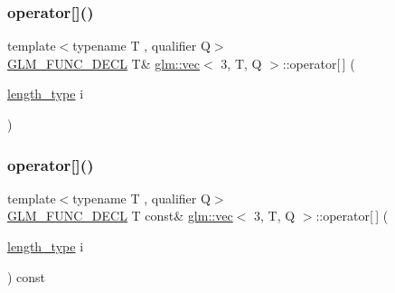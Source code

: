 \mbox{\label{structglm_1_1vec_3_013_00_01_t_00_01_q_01_4_a7f555e7e0581a8e53ac675fde684055b}} 
\subsubsection{\texorpdfstring{operator[]()}{operator[]()}\hspace{0.1cm}{\footnotesize\ttfamily [1/2]}}
{\footnotesize\ttfamily template$<$typename T , qualifier Q$>$ \\
\hyperlink{setup_8hpp_ab2d052de21a70539923e9bcbf6e83a51}{G\+L\+M\+\_\+\+F\+U\+N\+C\+\_\+\+D\+E\+CL} T\& \hyperlink{structglm_1_1vec}{glm\+::vec}$<$ 3, T, Q $>$\+::operator\mbox{[}$\,$\mbox{]} (\begin{DoxyParamCaption}\item[{\hyperlink{structglm_1_1vec_3_013_00_01_t_00_01_q_01_4_ab586a87f82719bfdd180336a98843257}{length\+\_\+type}}]{i }\end{DoxyParamCaption})}

\mbox{\label{structglm_1_1vec_3_013_00_01_t_00_01_q_01_4_a361188d270506795b9a46c2fc2857e69}} 
\subsubsection{\texorpdfstring{operator[]()}{operator[]()}\hspace{0.1cm}{\footnotesize\ttfamily [2/2]}}
{\footnotesize\ttfamily template$<$typename T , qualifier Q$>$ \\
\hyperlink{setup_8hpp_ab2d052de21a70539923e9bcbf6e83a51}{G\+L\+M\+\_\+\+F\+U\+N\+C\+\_\+\+D\+E\+CL} T const\& \hyperlink{structglm_1_1vec}{glm\+::vec}$<$ 3, T, Q $>$\+::operator\mbox{[}$\,$\mbox{]} (\begin{DoxyParamCaption}\item[{\hyperlink{structglm_1_1vec_3_013_00_01_t_00_01_q_01_4_ab586a87f82719bfdd180336a98843257}{length\+\_\+type}}]{i }\end{DoxyParamCaption}) const}


